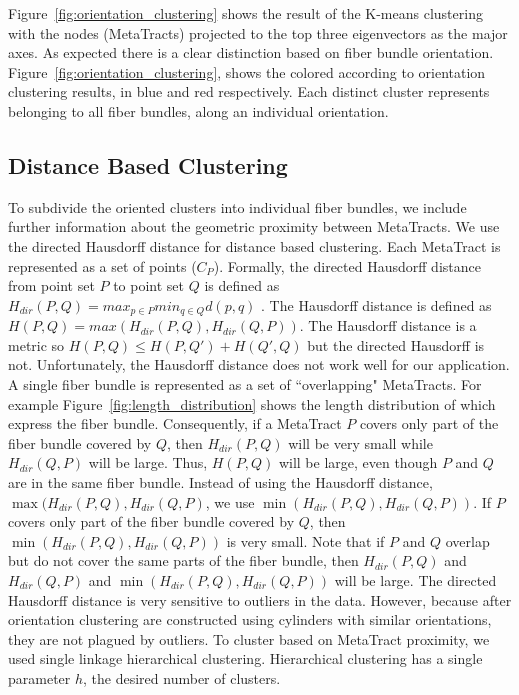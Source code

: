 Figure~\ref{fig:orientation_clustering} shows the result of the K-means clustering with the nodes (MetaTracts) projected to the top three eigenvectors as the major axes. As expected there is a clear distinction based on fiber bundle orientation. Figure~\ref{fig:orientation_clustering}, shows the \mt colored according to orientation clustering results, in blue and red respectively.
Each distinct cluster represents \mt belonging to all fiber bundles, along an individual orientation. 
\subsection{Distance Based Clustering}
\label{subsec:dist_clustering}
To subdivide the oriented clusters into individual fiber bundles, we include further information about the geometric proximity between MetaTracts. We use the directed Hausdorff distance for distance based clustering.
Each MetaTract is represented as a set of points ($C_P$). Formally, the directed Hausdorff distance from point set $P$ to point set $Q$ is defined as 
$H_{dir}(P,Q) = max_{p \in P} min_{q \in Q} d(p,q)$ .
The Hausdorff distance is defined as $H(P,Q) = max(H_{dir}(P,Q),H_{dir}(Q,P))$.
The Hausdorff distance is a metric so $H(P,Q) \le H(P,Q') + H(Q',Q)$ but the directed Hausdorff is not.
%
Unfortunately, the Hausdorff distance does not work well for our application. A single fiber bundle is represented as a set of ``overlapping" MetaTracts. For example  Figure~\ref{fig:length_distribution} shows the length distribution of \mt which express the fiber bundle. Consequently, if a MetaTract $P$ covers only part of the fiber bundle covered by $Q$, then $H_{dir}(P,Q)$ will be very small while $H_{dir}(Q,P)$ will be large.
%
Thus, $H(P,Q)$ will be large, even though $P$ and $Q$ are in the same fiber bundle.
Instead of using the Hausdorff distance, $\max(H_{dir}(P,Q),H_{dir}(Q,P)$, we use $\min(H_{dir}(P,Q),H_{dir}(Q,P))$. If $P$ covers only part of the fiber bundle covered by $Q$, then $\min(H_{dir}(P,Q),H_{dir}(Q,P))$ is very small.
Note that if $P$ and $Q$ overlap but do not cover the same parts of the fiber bundle, then $H_{dir}(P,Q)$ and $H_{dir}(Q,P)$ and $\min(H_{dir}(P,Q),H_{dir}(Q,P))$ will be large.
% 
The directed Hausdorff distance is very sensitive to outliers in the data.
However, because \mt after orientation clustering are constructed using cylinders with similar orientations, they are not plagued by outliers.
To cluster based on MetaTract proximity, we used single linkage hierarchical clustering.
Hierarchical clustering has a single parameter $h$, the desired number of clusters.
